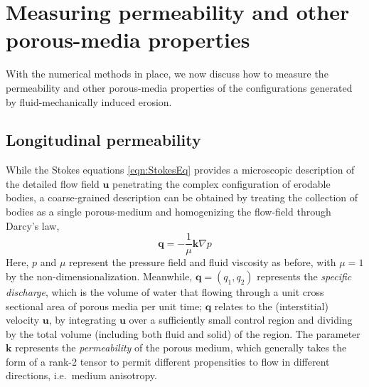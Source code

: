\documentclass[3p]{elsarticle}
\newcommand{\grad}{{\nabla}}
\newcommand{\uu}{{\mathbf{u}}}
\newcommand{\bvec}[1]{\mathbf{#1}}
\newcommand {\bq} {\bvec{q}}
\begin{document}
\section{Measuring permeability and other porous-media properties}
\label{sec:}

With the numerical methods in place, we now discuss how to measure the permeability and other porous-media properties of the configurations generated by fluid-mechanically induced erosion.

\subsection{Longitudinal permeability}
\label{LongPerm}

While the Stokes equations \eqref{eqn:StokesEq} provides a microscopic description of the detailed flow field $\uu$ penetrating the complex configuration of erodable bodies, a coarse-grained description can be obtained by treating the collection of bodies as a single porous-medium and homogenizing the flow-field through Darcy's law,
\begin{equation}
\label{eqn:Darcy}
\bq = - \frac{1}{\mu} \bvec{k} \grad p
\end{equation}
Here, $p$ and $\mu$ represent the pressure field and fluid viscosity as before, with $\mu = 1$ by the non-dimensionalization. Meanwhile, $\bq = (q_1, q_2)$ represents the {\em specific discharge}, which is the volume of water that flowing through a unit cross sectional area of porous media per unit time; $\bq$ relates to the (interstitial) velocity $\uu$, by integrating $\uu$ over a sufficiently small control region and dividing by the total volume (including both fluid and solid) of the region. The parameter $\bvec{k}$ represents the {\em permeability} of the porous medium, which generally takes the form of a rank-2 tensor to permit different propensities to flow in different directions, i.e.~medium anisotropy. 


\end{document}
